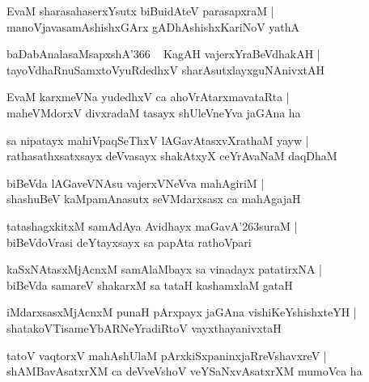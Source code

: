 \documentclass[twoside,12pt,openright]{book}
\def\S{\char'263}
\newcounter{shloka}[chapter]
\begin{document}
\begin{shloka}%
EvaM sharasahaserxYsutx biBuidAteV parasapxraM |\\
manoVjavasamAshishxGArx gADhAshishxKariNoV yathA 
\end{shloka}

\begin{shloka}%
baDabAnalasaMsapxshA\char'366 ~ KagAH vajerxYraBeVdhakAH |\\
tayoVdhaRnuSamxtoVyuRdedhxV sharAsutxlayxguNAnivxtAH 
\end{shloka}

\begin{shloka}%
EvaM karxmeVNa yudedhxV ca ahoVrAtarxmavataRta |\\
maheVMdorxV divxradaM tasayx shUleVneYva jaGAna ha 
\end{shloka}

\begin{shloka}%
sa nipatayx mahiVpaqSeThxV lAGavAtasxvXrathaM yayw |\\
rathasathxsatxsayx deVvasayx shakAtxyX ceYrAvaNaM daqDhaM 
\end{shloka}

\begin{shloka}%
biBeVda lAGaveVNAsu vajerxVNeVva mahAgiriM |\\
shashuBeV kaMpamAnasutx seVMdarxsasx ca mahAgajaH 
\end{shloka}

\begin{shloka}%
tatashagxkitxM samAdAya Avidhayx maGavA\S suraM |\\
biBeVdoVrasi deYtayxsayx sa papAta rathoVpari 
\end{shloka}

\begin{shloka}%
kaSxNAtasxMjAcnxM samAlaMbayx sa vinadayx patatirxNA |\\
biBeVda samareV shakarxM sa tataH kashamxlaM gataH 
\end{shloka}

\begin{shloka}%
iMdarxsasxMjAcnxM punaH pArxpayx jaGAna vishiKeYshishxteYH |\\
shatakoVTisameYbARNeYradiRtoV vayxthayanivxtaH
\end{shloka}

\begin{shloka}%
tatoV vaqtorxV mahAshUlaM pArxkiSxpaninxjaRreVshavxreV |\\
shAMBavAsatxrXM ca deVveVshoV veYSaNxvAsatxrXM mumoVca ha 
\end{shloka}
\end{document}
